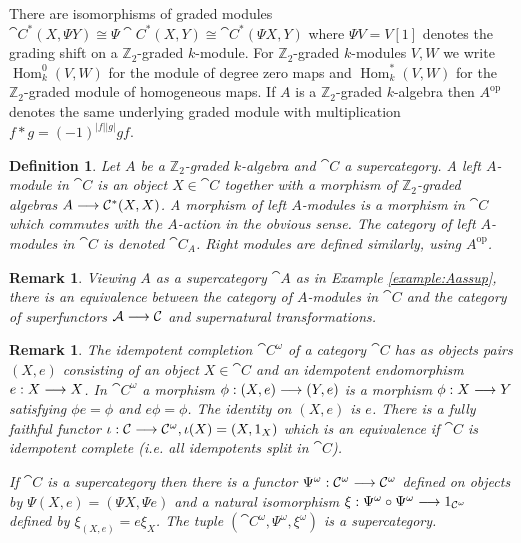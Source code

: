 \documentclass[english,letter paper,12pt,leqno]{article}
\theoremstyle{example}
\newtheorem{definition}[theorem]{Definition}
\newtheorem{remark}[theorem]{Remark}
\numberwithin{equation}{section}
\def\Hom{\operatorname{Hom}}
\begin{document}
There are isomorphisms of graded modules $\cat{C}^*(X, \Psi Y) \cong \Psi \cat{C}^*(X, Y) \cong \cat{C}^*(\Psi X, Y)$ where $\Psi V = V [1]$ denotes the grading shift on a $\mathbb{Z}_2$-graded $k$-module. For $\mathbb{Z}_2$-graded $k$-modules $V,W$ we write $\Hom^0_k(V, W)$ for the module of degree zero maps and $\Hom_k^*(V, W)$ for the $\mathbb{Z}_2$-graded module of homogeneous maps. If $A$ is a $\mathbb{Z}_2$-graded $k$-algebra then $A^{\operatorname{op}}$ denotes the same underlying graded module with multiplication $f * g = (-1)^{|f||g|} gf$.

\begin{definition}\label{defn:algebra_modules} Let $A$ be a $\mathbb{Z}_2$-graded $k$-algebra and $\cat{C}$ a supercategory. A \emph{left $A$-module in $\cat{C}$} is an object $X \in \cat{C}$ together with a morphism of $\mathbb{Z}_2$-graded algebras $A \longrightarrow \mathcal{C}^*(X,X)$. A \emph{morphism} of left $A$-modules is a morphism in $\cat{C}$ which commutes with the $A$-action in the obvious sense. The category of left $A$-modules in $\cat{C}$ is denoted $\cat{C}_A$. Right modules are defined similarly, using $A^{\operatorname{op}}$.
\end{definition}

\begin{remark}\label{remark:supercat_idempcomp} Viewing $A$ as a supercategory $\cat{A}$ as in Example \ref{example:Aassup}, there is an equivalence between the category of $A$-modules in $\cat{C}$ and the category of superfunctors $\mathcal{A} \longrightarrow \mathcal{C}$ and supernatural transformations.
\end{remark}

\begin{remark}\label{remark:idempotent_completion} The \emph{idempotent completion} $\cat{C}^\omega$ of a category $\cat{C}$ has as objects pairs $(X,e)$ consisting of an object $X \in \cat{C}$ and an idempotent endomorphism $e: X \longrightarrow X$. In $\cat{C}^\omega$ a morphism $\phi: (X,e) \longrightarrow (Y,e)$ is a morphism $\phi: X \longrightarrow Y$ satisfying $\phi e = \phi$ and $e \phi = \phi$. The identity on $(X,e)$ is $e$. There is a fully faithful functor $\iota: \mathcal{C} \longrightarrow \mathcal{C}^{\omega}, \iota(X) = (X,1_X)$ which is an equivalence if $\cat{C}$ is idempotent complete (i.e. all idempotents split in $\cat{C}$).

If $\cat{C}$ is a supercategory then there is a functor $\Psi^\omega: \mathcal{C}^\omega \longrightarrow \mathcal{C}^\omega$ defined on objects by $\Psi(X,e) = (\Psi X, \Psi e)$ and a natural isomorphism $\xi: \Psi^\omega \circ \Psi^\omega \longrightarrow 1_{\mathcal{C}^\omega}$ defined by $\xi_{(X,e)} = e \xi_X$. The tuple $(\cat{C}^\omega, \Psi^\omega, \xi^\omega)$ is a supercategory.
\end{remark}
\end{document}
